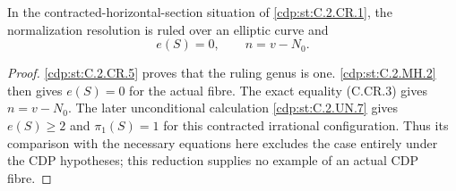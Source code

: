 
\begin{proposition}\label{cdp:st:C.2.MH.3}
In the contracted-horizontal-section situation of
\ref{cdp:st:C.2.CR.1}, the normalization resolution is ruled over
an elliptic curve and
\[
                    e(S)=0,\qquad n=v-N_0.
 \tag{C.MH.15}\label{cdp:eq:C.MH.15}
\]
\end{proposition}
\begin{proof}
\ref{cdp:st:C.2.CR.5} proves that the ruling genus is one.
\ref{cdp:st:C.2.MH.2} then gives $e(S)=0$ for the actual fibre.
The exact equality (C.CR.3) gives $n=v-N_0$.
The later unconditional calculation \ref{cdp:st:C.2.UN.7}
gives $e(S)\ge2$ and $\pi_1(S)=1$ for this
contracted irrational configuration. Thus its
comparison with the necessary equations here
excludes the case entirely under the CDP
hypotheses; this reduction supplies no example
of an actual CDP fibre.
\end{proof}


